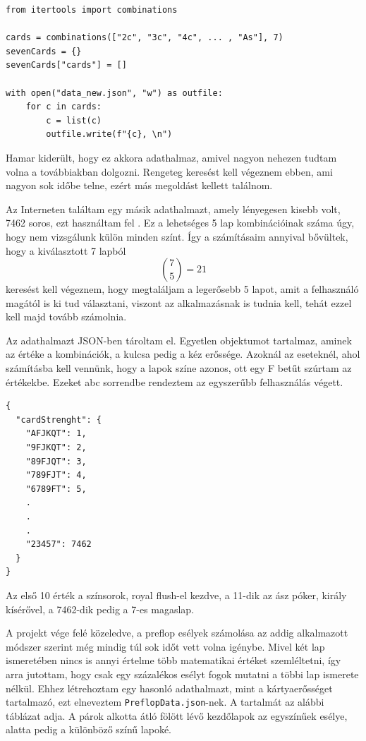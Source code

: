 \begin{lstlisting}[style=htmlcssjs]
from itertools import combinations

cards = combinations(["2c", "3c", "4c", ... , "As"], 7)
sevenCards = {}
sevenCards["cards"] = []

with open("data_new.json", "w") as outfile:
    for c in cards:
        c = list(c)
        outfile.write(f"{c}, \n")
\end{lstlisting}

Hamar kiderült, hogy ez akkora adathalmaz, amivel nagyon nehezen tudtam volna a továbbiakban dolgozni. Rengeteg keresést kell végeznem ebben, ami nagyon sok időbe telne, ezért más megoldást kellett találnom.

Az Interneten találtam egy másik adathalmazt, amely lényegesen kisebb volt, 7462 soros, ezt használtam fel \cite{chances}.
Ez a lehetséges 5 lap kombinációinak száma úgy, hogy nem vizsgálunk külön minden színt. Így a számításaim annyival bővültek, hogy a kiválasztott 7 lapból \[ \binom{7}{5}=21\] keresést kell végeznem, hogy megtaláljam a legerősebb 5 lapot, amit a felhasználó magától is ki tud választani, viszont az alkalmazásnak is tudnia kell, tehát ezzel kell majd tovább számolnia.

Az adathalmazt JSON-ben tároltam el. Egyetlen objektumot tartalmaz, aminek az értéke a kombinációk, a kulcsa pedig a kéz erőssége. Azoknál az eseteknél, ahol számításba kell vennünk, hogy a lapok színe azonos, ott egy F betűt szúrtam az értékekbe. Ezeket abc sorrendbe rendeztem az egyszerűbb felhasználás végett.

\begin{lstlisting}[style=htmlcssjs]
{
  "cardStrenght": {
    "AFJKQT": 1,
    "9FJKQT": 2,
    "89FJQT": 3,
    "789FJT": 4,
    "6789FT": 5,
    .
    .
    .
    "23457": 7462
  }
}
\end{lstlisting}

Az első 10 érték a színsorok, royal flush-el kezdve, a 11-dik az ász póker, király kísérővel, a 7462-dik pedig a 7-es magaslap.

A projekt vége felé közeledve, a preflop esélyek számolása az addig alkalmazott módszer szerint még mindig túl sok időt vett volna igénybe. Mivel két lap ismeretében nincs is annyi értelme több matematikai értéket szemléltetni, így arra jutottam, hogy csak egy százalékos esélyt fogok mutatni a többi lap ismerete nélkül. Ehhez létrehoztam egy hasonló adathalmazt, mint a kártyaerősséget tartalmazó, ezt elneveztem \texttt{PreflopData.json}-nek. A tartalmát az alábbi táblázat adja. A párok alkotta átló fölött lévő kezdőlapok az egyszínűek esélye, alatta pedig a különböző színű lapoké.

